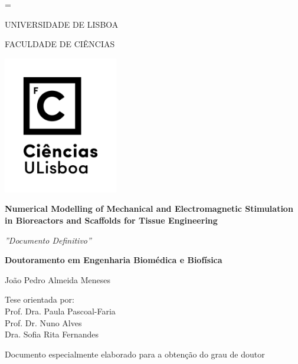 \documentclass[12pt]{report}
\begin{document}

\emergencystretch=\maxdimen
{}

\begin{titlepage}
\centering
{\fontsize{12}{14}\selectfont UNIVERSIDADE DE LISBOA\\}
{\fontsize{12}{14}\selectfont FACULDADE DE CIÊNCIAS\par}
\vspace{1\baselineskip}
\includegraphics[width=5cm]{./figures/FCULogoB.png}\par
\vspace{1\baselineskip}
{\fontsize{12}{14} \selectfont \textbf{Numerical Modelling of Mechanical and Electromagnetic Stimulation in Bioreactors and Scaffolds for Tissue Engineering}\par}
\vspace{1\baselineskip}
{\fontsize{12}{14}\selectfont \textit{''Documento Definitivo''}\par}
\vspace{2\baselineskip}
{\fontsize{12}{14}\selectfont \textbf{Doutoramento em Engenharia Biomédica e Biofísica} \par}
\vspace{2\baselineskip}
{\fontsize{12}{14}\selectfont João Pedro Almeida Meneses\\}
\vspace{1\baselineskip}
{\fontsize{12}{14}\selectfont Tese orientada por:\\Prof. Dra. Paula Pascoal-Faria\\Prof. Dr. Nuno Alves\\ Dra. Sofia Rita Fernandes\par}
\vfill
{\fontsize{12}{14}\selectfont Documento especialmente elaborado para a obtenção do grau de doutor\\}
\vspace{1\baselineskip}
{\fontsize{14}{17}}
\end{titlepage}
\end{document}

